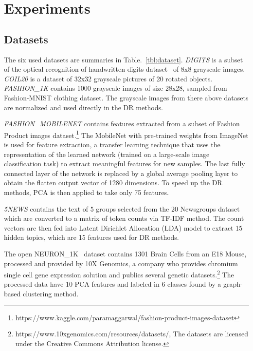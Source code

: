 \section{Experiments}

\subsection{Datasets}

The six used datasets are summaries in Table.~\ref{tbl:dataset}.
\emph{DIGITS} is a subset of the optical recognition of handwritten digits dataset~\cite{kaynak1995methods} of 8x8 grayscale images.
\emph{COIL20} \cite{nene1996} is a dataset of 32x32 grayscale pictures of 20 rotated objects.
\emph{FASHION\_1K} contains 1000 grayscale images of size 28x28, sampled from Fashion-MNIST\cite{xiao2017/online} clothing dataset.
The grayscale images from there above datasets are normalized and used directly in the DR methods.

\emph{FASHION\_MOBILENET} contains features extracted from a subset of Fashion Product images dataset.\footnote{https://www.kaggle.com/paramaggarwal/fashion-product-images-dataset}
The MobileNet\cite{} with pre-trained weights from ImageNet is used for feature extraction, a transfer learning technique that uses the representation of the learned network (trained on a large-scale image classification task) to extract meaningful features for new samples.
The last fully connected layer of the network is replaced by a global average pooling layer\cite{} to obtain the flatten output vector of 1280 dimensions.
To speed up the DR methods, PCA is then applied to take only 75 features.

\emph{5NEWS} contains the text of 5 groups selected from the 20 Newsgroups dataset which are converted to a matrix of token counts via TF-IDF method.
The count vectors are then fed into Latent Dirichlet Allocation (LDA) model to extract 15 hidden topics, which are 15 features used for DR methods.

The open NEURON\_1K~\cite{neuron1k} dataset contains 1301 Brain Cells from an E18 Mouse, processed and provided by 10X Genomics,
a company who provides chromium single cell gene expression solution and publics several genetic datasets.\footnote{https://www.10xgenomics.com/resources/datasets/, The datasets are licensed under the Creative Commons Attribution license.}
The processed data have 10 PCA features and labeled in 6 classes found by a graph-based clustering method.


